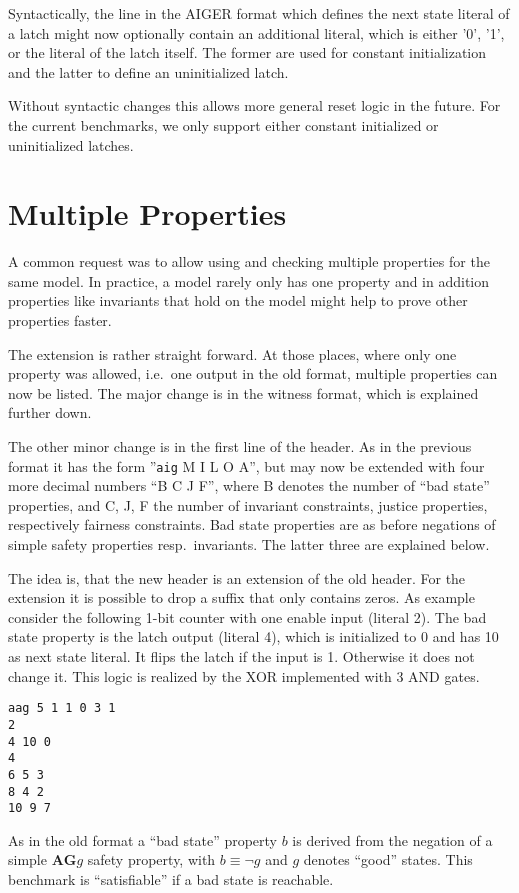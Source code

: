 \documentclass{llncs}
\begin{document}
Syntactically, the line in the AIGER format which defines the next state
literal of a latch might now optionally contain an additional literal, which
is either '0', '1', or the literal of the latch itself.  The former are used
for constant initialization and the latter to define an uninitialized latch.

Without syntactic changes this allows more general reset logic in the
future.  For the current benchmarks, we only support either constant
initialized or uninitialized latches.

\section{Multiple Properties}

A common request was to allow using and checking multiple
properties for the same model.  In practice, a model rarely only has one
property and in addition properties like invariants that hold on the model
might help to prove other properties faster.

The extension is rather straight forward.  At those places,
where only one property was allowed,
i.e.~one output in the old format, multiple properties can now be listed.
The major change is in the witness format, which is explained further down.

The other minor change is in the first line of the header.  As in the previous
format it has the form ''\texttt{aig} M I L O A'', but may now be
extended with four more decimal numbers ``B C J F'', where B denotes the
number of ``bad state'' properties, and C, J, F the number of
invariant constraints, justice properties, respectively fairness
constraints.  Bad state properties
are as before negations of simple safety properties resp.~invariants.
The latter three are explained below.

The idea is, that the new header is an extension of the old header.
For the extension it is possible to drop a suffix that only contains
zeros.  As example consider the following 1-bit counter with one enable
input (literal 2).  The bad state property is the latch output (literal 4),
which is initialized to 0 and has 10 as next state literal.  It flips the
latch if the input is 1.  Otherwise it does not change it.  This logic is
realized by the XOR implemented with 3 AND gates.
{\small
\begin{verbatim}
aag 5 1 1 0 3 1
2
4 10 0
4
6 5 3
8 4 2
10 9 7
\end{verbatim}}
As in the old format a ``bad state'' property $b$ is derived from the negation
of a simple $\mathrel{\mathbf{A}} \mathrel{\mathbf{G}} g$ safety property,
with $b \equiv \neg g$ and $g$ denotes ``good'' states.  This benchmark is
``satisfiable'' if a bad state is reachable.
\end{document}
